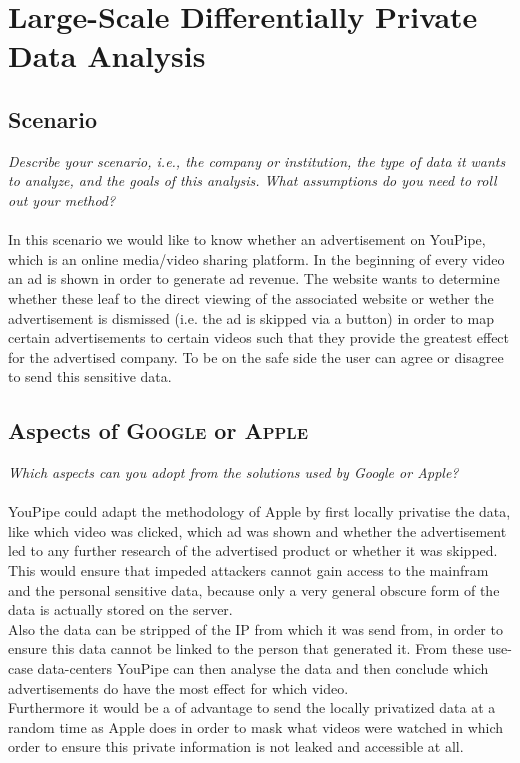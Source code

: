 \documentclass{report}
\begin{document}
	\section{Large-Scale Differentially Private Data Analysis}
	\startsection
		\renewcommand{\thesubsection}{\thesection.\alph{subsection}}
		\subsection{Scenario}
		\startsubsection
			\textit{Describe your scenario, i.e., the company or institution, the type of data it wants to analyze, and the goals of this analysis. What assumptions do you need to roll out your method?} \\ \\
			In this scenario we would like to know whether an advertisement on YouPipe, which is an online media/video sharing platform. In the beginning of every video an ad is shown in order to generate ad revenue. The website wants to determine whether these leaf to the direct viewing of the associated website or wether the advertisement is dismissed (i.e. the ad is skipped via a button) in order to map certain advertisements to certain videos such that they provide the greatest effect for the advertised company. To be on the safe side the user can agree or disagree to send this sensitive data.
		\closesection
		\subsection{Aspects of \textsc{Google} or \textsc{Apple}}
		\startsubsection
			\textit{Which aspects can you adopt from the solutions used by Google or Apple?} \\ \\
			YouPipe could adapt the methodology of Apple by first locally privatise the data, like which video was clicked, which ad was shown and whether the advertisement led to any further research of the advertised product or whether it was skipped. This would ensure that impeded attackers cannot gain access to the mainfram and the personal sensitive data, because only a very general obscure form of the data is actually stored on the server. \\
			Also the data can be stripped of the IP from which it was send from, in order to ensure this data cannot be linked to the person that generated it. From these use-case data-centers YouPipe can then analyse the data and then conclude which advertisements do have the most effect for which video. \\
			Furthermore it would be a of advantage to send the locally privatized data at a random time as Apple does in order to mask what videos were watched in which order to ensure this private information is not leaked and accessible at all.
		\closesection
\end{document}
